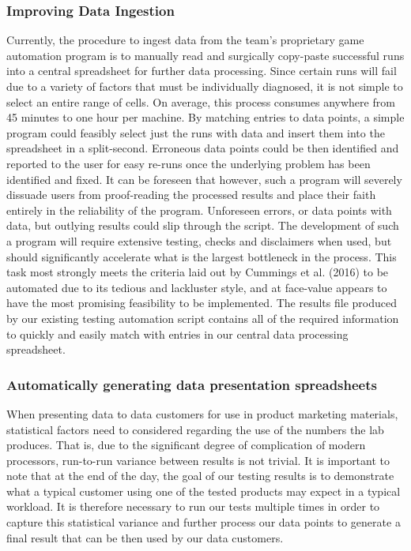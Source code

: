 \documentclass[12pt]{article}
\begin{document}
\subsubsection{ Improving Data Ingestion}

Currently, the procedure to ingest data from the team’s proprietary game automation program is to manually read and surgically copy-paste successful runs into a central spreadsheet for further data processing. Since certain runs will fail due to a variety of factors that must be individually diagnosed, it is not simple to select an entire range of cells. On average, this process consumes anywhere from 45 minutes to one hour per machine. By matching entries to data points, a simple program could feasibly select just the runs with data and insert them into the spreadsheet in a split-second. Erroneous data points could be then identified and reported to the user for easy re-runs once the underlying problem has been identified and fixed. It can be foreseen that however, such a program will severely dissuade users from proof-reading the processed results and place their faith entirely in the reliability of the program. Unforeseen errors, or data points with data, but outlying results could slip through the script. The development of such a program will require extensive testing, checks and disclaimers when used, but should significantly accelerate what is the largest bottleneck in the process. This task most strongly meets the criteria laid out by Cummings et al. (2016) to be automated due to its tedious and lackluster style, and at face-value appears to have the most promising feasibility to be implemented. The results file produced by our existing testing automation script contains all of the required information to quickly and easily match with entries in our central data processing spreadsheet.

\subsubsection{Automatically generating data presentation spreadsheets}
When presenting data to data customers for use in product marketing materials, statistical factors need to considered regarding the use of the numbers the lab produces. That is, due to the significant degree of complication of modern processors, run-to-run variance between results is not trivial. It is important to note that at the end of the day, the goal of our testing results is to demonstrate what a typical customer using one of the tested products may expect in a typical workload. It is therefore necessary to run our tests multiple times in order to capture this statistical variance and further process our data points to generate a final result that can be then used by our data customers. 
\end{document}
